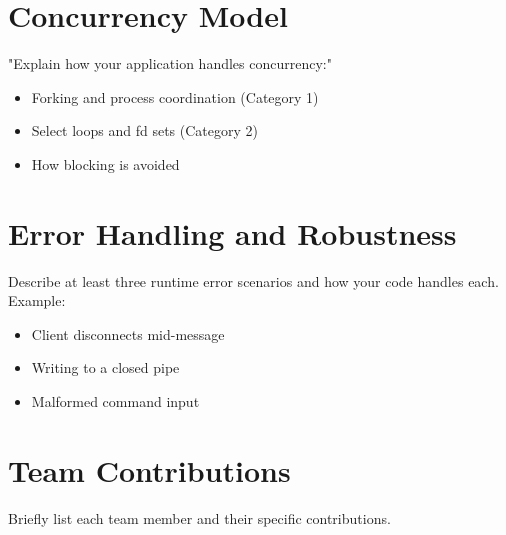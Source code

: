 \documentclass[12pt]{report}
\begin{document}
\chapter{Concurrency Model}


"Explain how your application handles concurrency:"
\begin{itemize}
    \item Forking and process coordination (Category 1)
    \item Select loops and fd sets (Category 2)
    \item How blocking is avoided
\end{itemize}

\chapter{Error Handling and Robustness}


Describe at least three runtime error scenarios and how your code handles each. Example:
\begin{itemize}
    \item Client disconnects mid-message
    \item Writing to a closed pipe
    \item Malformed command input
\end{itemize}

\chapter{Team Contributions}
Briefly list each team member and their specific contributions.
\end{document}
